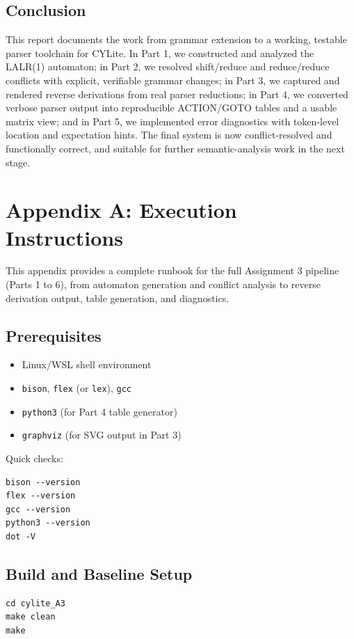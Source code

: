 \documentclass[a4paper,12pt]{article}
\begin{document}
\subsection{Conclusion}

This report documents the work from grammar extension to a working, testable parser toolchain for CYLite. In Part 1, we constructed and analyzed the LALR(1) automaton; in Part 2, we resolved shift/reduce and reduce/reduce conflicts with explicit, verifiable grammar changes; in Part 3, we captured and rendered reverse derivations from real parser reductions; in Part 4, we converted verbose parser output into reproducible ACTION/GOTO tables and a usable matrix view; and in Part 5, we implemented error diagnostics with token-level location and expectation hints. The final system is now conflict-resolved and functionally correct, and suitable for further semantic-analysis work in the next stage.


\newpage
\appendix
\section{Appendix A: Execution Instructions}

This appendix provides a complete runbook for the full Assignment 3 pipeline (Parts 1 to 6), from automaton generation and conflict analysis to reverse derivation output, table generation, and diagnostics.

\subsection{Prerequisites}
\begin{itemize}
    \item Linux/WSL shell environment
    \item \texttt{bison}, \texttt{flex} (or \texttt{lex}), \texttt{gcc}
    \item \texttt{python3} (for Part 4 table generator)
    \item \texttt{graphviz} (for SVG output in Part 3)
\end{itemize}

Quick checks:
\begin{lstlisting}
bison --version
flex --version
gcc --version
python3 --version
dot -V
\end{lstlisting}

\subsection{Build and Baseline Setup}
\begin{lstlisting}
cd cylite_A3
make clean
make
\end{lstlisting}
\end{document}
